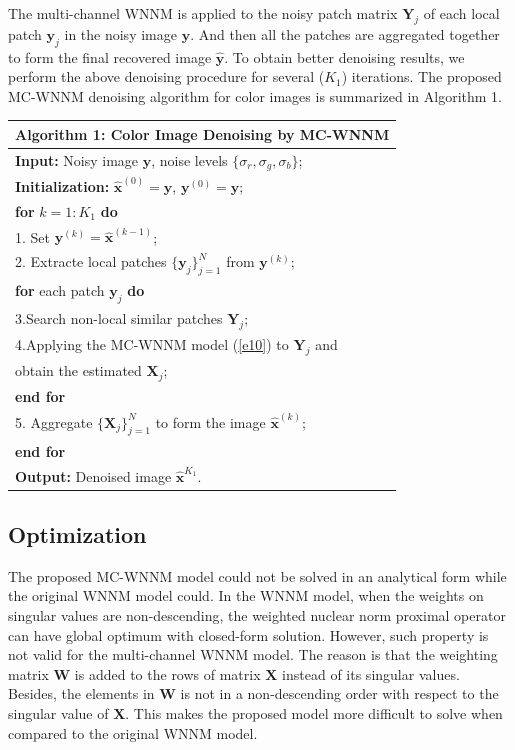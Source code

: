 \documentclass[10pt,twocolumn,letterpaper,sort&compress]{article}
\begin{document}
The multi-channel WNNM is applied to the noisy patch matrix $\mathbf{Y}_{j}$ of each local patch $\mathbf{y}_{j}$ in the noisy image $\mathbf{y}$. And then all the patches are aggregated together to form the final recovered image $\hat{\mathbf{y}}$. To obtain better denoising results, we perform the above denoising procedure for several ($K_{1}$) iterations. The proposed MC-WNNM denoising algorithm for color images is summarized in Algorithm 1.
\begin{table}
\begin{tabular}{l}
\hline
\textbf{Algorithm 1}: Color Image Denoising by MC-WNNM
\\
\hline
\textbf{Input:} Noisy image $\mathbf{y}$, noise levels $\{\sigma_{r}, \sigma_{g}, \sigma_{b}\}$;
\\
\textbf{Initialization:} $\hat{\mathbf{x}}^{(0)}=\mathbf{y}$, $\mathbf{y}^{(0)}=\mathbf{y}$;
\\
\textbf{for} $k = 1:K_{1}$ \textbf{do}
\\
1. Set $\mathbf{y}^{(k)}=\hat{\mathbf{x}}^{(k-1)}$;
\\
2. Extracte local patches $\{\mathbf{y}_{j}\}_{j=1}^{N}$ from $\mathbf{y}^{(k)}$;
\\
\quad\textbf{for} each patch $\mathbf{y}_{j}$ \textbf{do}
\\
3.\quad Search non-local similar patches $\mathbf{Y}_{j}$;
\\
4.\quad Applying the MC-WNNM model (\ref{e10}) to $\mathbf{Y}_{j}$ and
\\
\quad \quad 
obtain the estimated $\mathbf{X}_{j}$;
\\
\quad\textbf{end for}
\\
5. Aggregate $\{\mathbf{X}_{j}\}_{j=1}^{N}$ to form the image $\hat{\mathbf{x}}^{(k)}$;
\\
\textbf{end for}
\\
\textbf{Output:} Denoised image $\hat{\mathbf{x}}^{K_{1}}$.
\\
\hline
\end{tabular}
\vspace{-6mm}
\label{a1}
\end{table}


\subsection{Optimization}
The proposed MC-WNNM model could not be solved in an analytical form while the original WNNM model \cite{wnnmijcv} could. In the WNNM model, when the weights on singular values are non-descending, the weighted nuclear norm proximal operator \cite{wnnmijcv} can have global optimum with closed-form solution. However, such property is not valid for the multi-channel WNNM model. The reason is that the weighting matrix $\mathbf{W}$ is added to the rows of matrix $\mathbf{X}$ instead of its singular values. Besides, the elements in $\mathbf{W}$ is not in a non-descending order with respect to the singular value of $\mathbf{X}$. This makes the proposed model more difficult to solve when compared to the original WNNM model.
\end{document}
